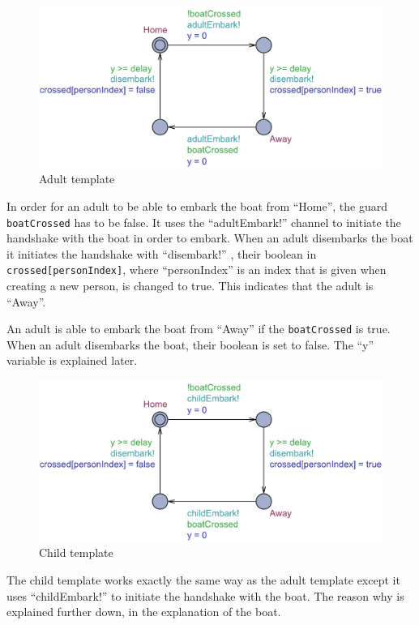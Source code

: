 \documentclass[a4paper,12pt]{article}
\begin{document}
\begin{figure}[H]
\centering
\includegraphics[width=\linewidth]{Adult.pdf}
\caption{Adult template}
\label{fig:adult}
\end{figure}

In order for an adult to be able to embark the boat from ``Home'', the guard \lstinline|boatCrossed| has to be false.  It uses the ``adultEmbark!'' channel to initiate the handshake with the boat in order to embark. When an adult disembarks the boat it initiates the handshake with ``disembark!'' , their boolean in \lstinline|crossed[personIndex]|, where ``personIndex'' is an index that is given when creating a new person, is changed to true. This indicates that the adult is ``Away''. 

An adult is able to embark the boat from ``Away'' if the \lstinline|boatCrossed| is true. When an adult disembarks the boat, their boolean is set to false. The ``y'' variable is explained later. 

\begin{figure}[H]
\centering
\includegraphics[width=\linewidth]{Child.pdf}
\caption{Child template}
\label{fig:child}
\end{figure}

The child template works exactly the same way as the adult template except it uses ``childEmbark!'' to initiate the handshake with the boat. The reason why is explained further down, in the explanation of the boat.
\end{document}
